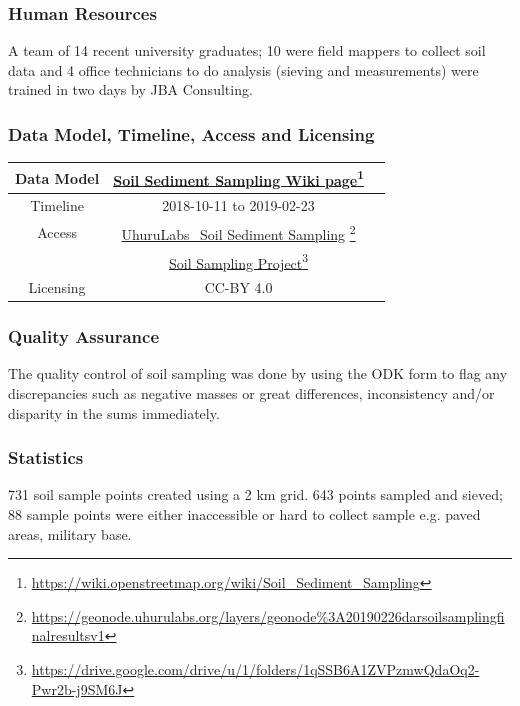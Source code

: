 \documentclass[a4paper,12pt,twoside]{article}
\begin{document}
\subsubsection{Human Resources}
A team of 14 recent university graduates; 10 were field mappers to collect soil data and 4 office technicians to do analysis (sieving and measurements) were trained in two days by JBA Consulting.

\subsubsection{Data Model, Timeline, Access and Licensing}
\begin{center}
  \begin{tabular}{|c|c|c|}  
 \hline
    Data Model    &   \href{https://wiki.openstreetmap.org/wiki/Soil_Sediment_Sampling}{Soil Sediment Sampling Wiki page}\footnote{\url{https://wiki.openstreetmap.org/wiki/Soil_Sediment_Sampling}} \\
 \hline
   Timeline  &   2018-10-11 to 2019-02-23 \\
 \hline  
 Access  & 
    \href{https://geonode.uhurulabs.org/layers/geonode\%3A_2019_02_26_dar_soil_sampling_final_results_v1}{UhuruLabs\_Soil Sediment Sampling} \footnote{\url{https://geonode.uhurulabs.org/layers/geonode\%3A20190226darsoilsamplingfinalresultsv1}}\\
{} & \href{https://drive.google.com/drive/u/1/folders/1qSSB6A1ZVPzmwQdaOq2-Pwr2b-j9SM6J}{Soil Sampling Project}\footnote{\url{https://drive.google.com/drive/u/1/folders/1qSSB6A1ZVPzmwQdaOq2-Pwr2b-j9SM6J}}\\ \hline
Licensing &  CC-BY 4.0 \\
 \hline
  
\end{tabular}
\end{center}

\subsubsection{Quality Assurance}
The quality control of soil sampling was done by  using the ODK form to flag any discrepancies such as negative masses or great differences, inconsistency and/or disparity in the sums immediately.

\subsubsection{Statistics}
731 soil sample points created using a 2 km grid. 643 points sampled and sieved; 88 sample points were either inaccessible or hard to collect sample e.g. paved areas, military base.
\end{document}
